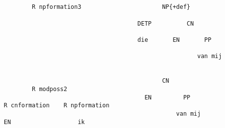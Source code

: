\begin{verbatim}


             R npformation3                       NP{+def}
                                                 
                                           DETP          CN

                                           die       EN       PP

                                                            van mij  

                                           
                                                  CN
             R modposs2
                                             EN         PP
     R cnformation    R npformation
                                                      van mij
     EN                   ik

\end{verbatim}

